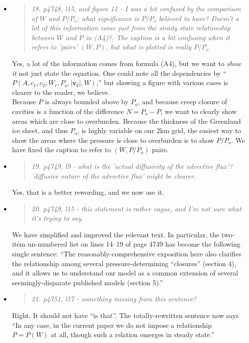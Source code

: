 \documentclass[11pt,reqno]{amsart}
\newcommand{\reply}[2]{
\medskip\medskip
\item  \begin{quote}
\emph{#1}
\end{quote}

\medskip
\noindent #2}
\begin{document}
\begin{itemize}
\reply{18. p4748, l15, and figure 11 - I was a bit confused by the comparison of $W$ and $P/P_o$; what significance is $P/P_o$ believed to have? Doesn't a lot of this information come just from the steady state relationship between $W$ and $P$ in (A4)?, The caption is a bit confusing when it refers to 'pairs' $(W,P)$, but what is plotted is really $P/P_o$.}
{Yes, a lot of the information comes from formula (A4), but we want to \emph{show it} not just state the equation.  One could note all the dependencies by ``$P(A,c_1,c_2,W_r,P_o,|\mathbf{v}_b|,W)$,'' but showing a figure with various cases is clearer to the reader, we believe.\\
\indent  Because $P$ is always bounded above by $P_o$, and because creep closure of cavities is a function of the difference $N=P_o-P$, we want to clearly show areas which are close to overburden.  Because the thickness of the Greenland ice sheet, and thus $P_o$, is highly variable on our 2km grid, the easiest way to show the areas where the pressure is close to overburden is to show $P/P_o$.  We have fixed the caption to refer to $(W,P/P_o)$ pairs.}

\reply{19. p4749, l9 - what is the 'actual diffusivity of the advective flux'?  'diffusive nature of the advective flux' might be clearer.}
{Yes, that is a better rewording, and we now use it.}

\reply{20. p4749, l15 - this statement is rather vague, and I'm not sure what it's trying to say.}
{We have simplified and improved the relevant text.  In particular, the two-item un-numbered list on lines 14--19 of page 4749 has become the following single sentence: ``The reasonably-comprehensive exposition here also clarifies the relationship among several pressure-determining ``closures'' (section 4), and it allows us to understand our model as a common extension of several seemingly-disparate published models (section 5).''}

\reply{21. p4751, l17 - something missing from this sentence?}
{Right.  It should not have ``is that''.  The totally-rewritten sentence now says ``In any case, in the current paper we do not impose a relationship $P=P(W)$ at all, though such a relation emerges in steady state.''}
\end{itemize}
\end{document}
